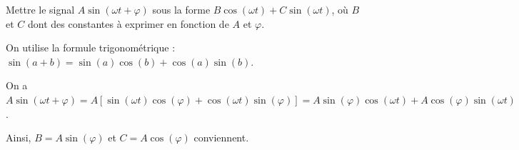 \hauteurLargeurCadreReponse		{8mm}{10cm}
\initialisationEntrainement

Mettre le signal $A\sin(\omega t+\varphi)$ sous la forme $B\cos(\omega t)+C\sin(\omega t)$, où $B$ et $C$ dont des constantes à exprimer en fonction de $A$ et $\varphi$.

\debutEntrainement


\begin{enonce}
\end{enonce}


\begin{corrige}
On utilise la formule trigonométrique : $\sin(a+b)=\sin(a)\cos(b)+\cos(a)\sin(b)$. 

On a $A\sin(\omega t+\varphi)=A\left[\sin(\omega t)\cos(\varphi)+\cos(\omega t)\sin(\varphi)\right]=A\sin(\varphi)\cos(\omega t)+A\cos(\varphi)\sin(\omega t)$. 

Ainsi, $B=A\sin(\varphi)$ et $C=A\cos(\varphi)$ conviennent.
\end{corrige}



\finEntrainement









